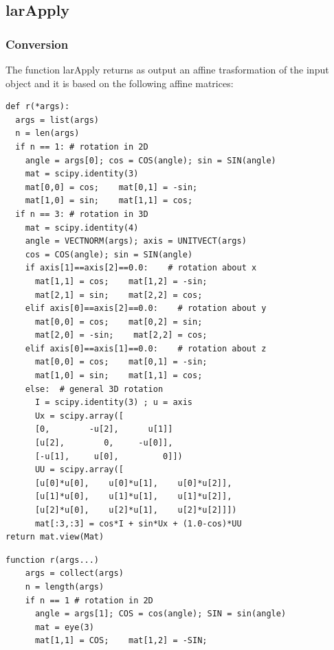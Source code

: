 \documentclass[a4paper,12pt]{article}
\begin{document}

\newpage
\subsection{larApply}
\subsubsection{Conversion}
The function larApply returns as output an affine trasformation of the input object and it is based on the following affine matrices:
\vspace{10px}

\noindent{}
\begin{multicols}{2}
\noindent {}
\begin{Verbatim}[fontsize=\scriptsize]
def r(*args):
  args = list(args)
  n = len(args)
  if n == 1: # rotation in 2D
    angle = args[0]; cos = COS(angle); sin = SIN(angle)
    mat = scipy.identity(3)
    mat[0,0] = cos;    mat[0,1] = -sin;
    mat[1,0] = sin;    mat[1,1] = cos;
  if n == 3: # rotation in 3D
    mat = scipy.identity(4)
    angle = VECTNORM(args); axis = UNITVECT(args)
    cos = COS(angle); sin = SIN(angle)
    if axis[1]==axis[2]==0.0:    # rotation about x
      mat[1,1] = cos;    mat[1,2] = -sin;
      mat[2,1] = sin;    mat[2,2] = cos;
    elif axis[0]==axis[2]==0.0:    # rotation about y
      mat[0,0] = cos;    mat[0,2] = sin;
      mat[2,0] = -sin;    mat[2,2] = cos;
    elif axis[0]==axis[1]==0.0:    # rotation about z
      mat[0,0] = cos;    mat[0,1] = -sin;
      mat[1,0] = sin;    mat[1,1] = cos;
    else:  # general 3D rotation
      I = scipy.identity(3) ; u = axis
      Ux = scipy.array([
	  [0,        -u[2],      u[1]]
	  [u[2],        0,     -u[0]],
	  [-u[1],     u[0],         0]])
      UU = scipy.array([
	  [u[0]*u[0],    u[0]*u[1],    u[0]*u[2]],
	  [u[1]*u[0],    u[1]*u[1],    u[1]*u[2]],
	  [u[2]*u[0],    u[2]*u[1],    u[2]*u[2]]])
	  mat[:3,:3] = cos*I + sin*Ux + (1.0-cos)*UU
return mat.view(Mat)
\end{Verbatim}
\columnbreak
{}
\begin{Verbatim}[fontsize=\scriptsize]
  function r(args...)
    args = collect(args)
    n = length(args)
    if n == 1 # rotation in 2D
      angle = args[1]; COS = cos(angle); SIN = sin(angle)
      mat = eye(3)
      mat[1,1] = COS;    mat[1,2] = -SIN;

\end{Verbatim}
\end{multicols}
\end{document}
